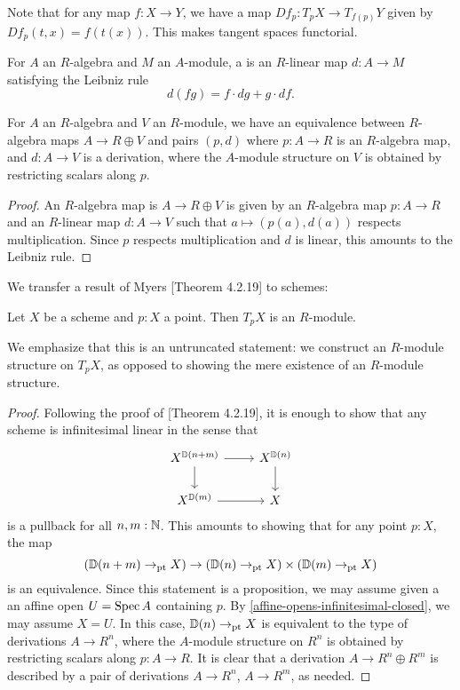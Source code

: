 Note that for any map $f : X \to Y$, we have a map 
$Df_p : T_p X \to T_{f(p)}Y$ given by $Df_p(t,x) = f(t(x))$.
This makes tangent spaces functorial.

\begin{definition}
For $A$ an $R$-algebra and $M$ an $A$-module, a 
is an $R$-linear map $d : A \to M$ satisfying the Leibniz rule
\[ d(fg) = f \cdot dg + g \cdot df.\]
\end{definition}

\begin{lemma}
For $A$ an $R$-algebra and $V$ an $R$-module, we have an equivalence
between $R$-algebra maps $A \to R \oplus V$ and 
pairs $(p,d)$ where $p : A \to R$ is an $R$-algebra map, and
$d : A \to V$ is a derivation, where the $A$-module structure on $V$
is obtained by restricting scalars along $p$.
\end{lemma}
\begin{proof}
An $R$-algebra map is $A \to R \oplus V$ is given by an 
$R$-algebra map $p : A \to R$ and an $R$-linear map
$d : A \to V$ such that $a \mapsto (p(a), d(a))$ respects multiplication.
Since $p$ respects multiplication and $d$ is linear, this
amounts to the Leibniz rule.
\end{proof}

We transfer a result of Myers \cite{david-orbifolds}[Theorem 4.2.19] to schemes:

\begin{theorem}%
  Let $X$ be a scheme and $p : X$ a point. Then $T_pX$ is an $R$-module.
\end{theorem}

We emphasize that this is an untruncated statement: we construct an
$R$-module structure on $T_p X$, as opposed to showing the mere existence of
an $R$-module structure.

\begin{proof}
  Following the proof of \cite{david-orbifolds}[Theorem 4.2.19],
  it is enough to show that any scheme is infinitesimal linear
  in the sense that
  \[
    \begin{tikzcd}
      X^{\D(n+m)}\ar[r]\ar[d] & X^{\D(n)}\ar[d] \\
      X^{\D(m)}\ar[r]         & X
    \end{tikzcd}
  \]
  is a pullback for all $n,m:\mathbb{N}$.
  This amounts to showing that for any point $p : X$, the map 
  \[
    \left(\mathbb{D}(n+m)\to_{\mathrm{pt}} X\right) \to 
    \left(\mathbb{D}(n)\to_{\mathrm{pt}} X\right) \times \left({\mathbb{D}(m)}\to_{\mathrm{pt}} X\right)
  \]
  is an equivalence.
  Since this statement is a proposition, we may assume given a
  an affine open $U = \operatorname{Spec} A$ containing $p$.
  By \cref{affine-opens-infinitesimal-closed}, we may assume $X = U$.
  In this case, $\mathbb{D}(n) \to_{\mathrm{pt}} X$ is equivalent to the type
  of derivations $A \to R^n$, where the $A$-module structure on $R^n$
  is obtained by restricting scalars along $p : A \to R$.
  It is clear that a derivation $A \to R^n \oplus R^m$
  is described by a pair of derivations $A \to R^n$, $A \to R^m$,
  as needed.
\end{proof}

